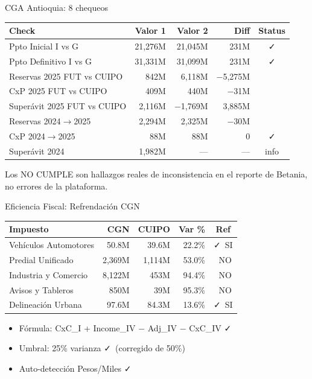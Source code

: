 \documentclass[aspectratio=169,11pt]{beamer}
\newcommand{\cmark}{\textcolor{verde}{\faCheck}}
\newcommand{\xmark}{\textcolor{rojo}{\faTimes}}
\begin{document}
\begin{frame}{CGA Antioquia: 8 chequeos}
\scriptsize
\begin{center}
\renewcommand{\arraystretch}{1.15}
\begin{tabular}{l r r r c}
\toprule
\textbf{Check} & \textbf{Valor 1} & \textbf{Valor 2} & \textbf{Diff} & \textbf{Status} \\
\midrule
Ppto Inicial I vs G & 21,276M & 21,045M & 231M & \cmark \\
Ppto Definitivo I vs G & 31,331M & 31,099M & 231M & \cmark \\
Reservas 2025 FUT vs CUIPO & 842M & 6,118M & $-$5,275M & \xmark \\
CxP 2025 FUT vs CUIPO & 409M & 440M & $-$31M & \xmark \\
Super\'avit 2025 FUT vs CUIPO & 2,116M & $-$1,769M & 3,885M & \xmark \\
Reservas 2024$\to$2025 & 2,294M & 2,325M & $-$30M & \xmark \\
CxP 2024$\to$2025 & 88M & 88M & 0 & \cmark \\
Super\'avit 2024 & 1,982M & --- & --- & info \\
\bottomrule
\end{tabular}
\end{center}
\vspace{4pt}
\textcolor{sepia}{\scriptsize Los NO CUMPLE son hallazgos reales de inconsistencia en el reporte de Betania, no errores de la plataforma.}
\end{frame}

\begin{frame}{Eficiencia Fiscal: Refrendaci\'on CGN}
\scriptsize
\begin{center}
\renewcommand{\arraystretch}{1.15}
\begin{tabular}{l r r r c}
\toprule
\textbf{Impuesto} & \textbf{CGN} & \textbf{CUIPO} & \textbf{Var \%} & \textbf{Ref} \\
\midrule
Veh\'iculos Automotores & 50.8M & 39.6M & 22.2\% & \cmark\ SI \\
Predial Unificado & 2,369M & 1,114M & 53.0\% & \xmark\ NO \\
Industria y Comercio & 8,122M & 453M & 94.4\% & \xmark\ NO \\
Avisos y Tableros & 850M & 39M & 95.3\% & \xmark\ NO \\
Delineaci\'on Urbana & 97.6M & 84.3M & 13.6\% & \cmark\ SI \\
\bottomrule
\end{tabular}
\end{center}
\vspace{4pt}
\begin{itemize}\setlength{\itemsep}{0pt}
    \item F\'ormula: CxC\_I + Income\_IV $-$ Adj\_IV $-$ CxC\_IV \cmark
    \item Umbral: 25\% varianza \cmark\ (corregido de 50\%)
    \item Auto-detecci\'on Pesos/Miles \cmark
\end{itemize}
\end{frame}
\end{document}
